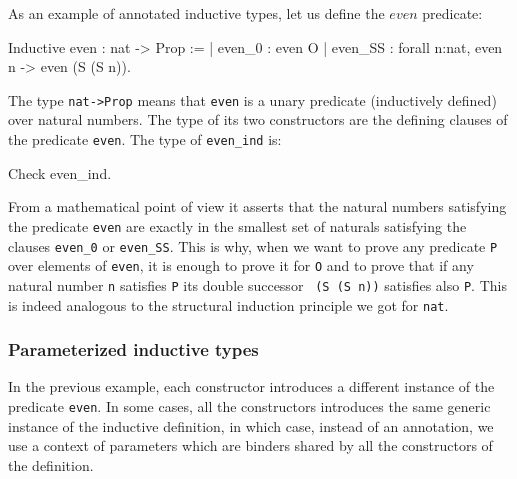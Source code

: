 As an example of annotated inductive types, let us define the
$even$ predicate:

\begin{coq_example}
Inductive even : nat -> Prop :=
  | even_0 : even O
  | even_SS : forall n:nat, even n -> even (S (S n)).
\end{coq_example}

The type {\tt nat->Prop} means that {\tt even} is a unary predicate
(inductively defined) over natural numbers.  The type of its two
constructors are the defining clauses of the predicate {\tt even}. The
type of {\tt even\_ind} is:

\begin{coq_example}
Check even_ind.
\end{coq_example}

From a mathematical point of view it asserts that the natural numbers
satisfying the predicate {\tt even} are exactly in the smallest set of
naturals satisfying the clauses {\tt even\_0} or {\tt even\_SS}. This
is why, when we want to prove any predicate {\tt P} over elements of
{\tt even}, it is enough to prove it for {\tt O} and to prove that if
any natural number {\tt n} satisfies {\tt P} its double successor {\tt
  (S (S n))} satisfies also {\tt P}. This is indeed analogous to the
structural induction principle we got for {\tt nat}.

\begin{ErrMsgs}
\item {}
\item {}
\end{ErrMsgs}

\subsubsection{Parameterized inductive types}
In the previous example, each constructor introduces a
different instance of the predicate {\tt even}. In some cases, 
all the constructors introduces the same generic instance of the
inductive definition, in which case, instead of an annotation, we use
a context of parameters which are binders shared by all the
constructors of the definition.


